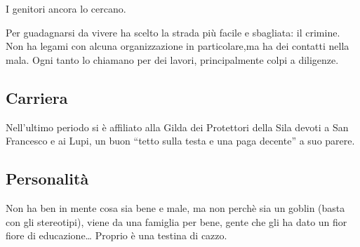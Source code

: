 I genitori ancora lo cercano.

Per guadagnarsi da vivere ha scelto la strada più facile e sbagliata: il
crimine. Non ha legami con alcuna organizzazione in particolare,ma ha
dei contatti nella mala. Ogni tanto lo chiamano per dei lavori,
principalmente colpi a diligenze.

\subsection{Carriera}\label{carriera}


Nell'ultimo periodo si è affiliato alla Gilda dei Protettori della Sila
devoti a San Francesco e ai Lupi, un buon ``tetto sulla testa e una paga
decente'' a suo parere.

\subsection{Personalità}\label{personalituxe0}


Non ha ben in mente cosa sia bene e male, ma non perchè sia un goblin
(basta con gli stereotipi), viene da una famiglia per bene, gente che
gli ha dato un fior fiore di educazione\ldots{} Proprio è una testina di
cazzo.

